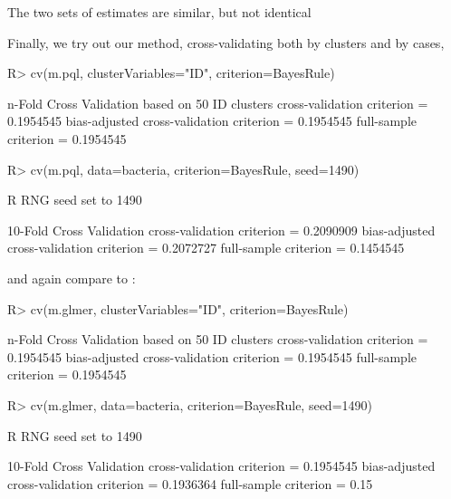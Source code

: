 \documentclass[
]{jss}
\begin{document}
The two sets of estimates are similar, but not identical

Finally, we try out our  method, cross-validating
both by clusters and by cases,

\begin{CodeChunk}
\begin{CodeInput}
R> cv(m.pql, clusterVariables="ID", criterion=BayesRule)
\end{CodeInput}
\begin{CodeOutput}
n-Fold Cross Validation based on 50 {ID} clusters
cross-validation criterion = 0.1954545
bias-adjusted cross-validation criterion = 0.1954545
full-sample criterion = 0.1954545 
\end{CodeOutput}
\begin{CodeInput}
R> cv(m.pql, data=bacteria, criterion=BayesRule, seed=1490)
\end{CodeInput}
\begin{CodeOutput}
R RNG seed set to 1490
\end{CodeOutput}
\begin{CodeOutput}
10-Fold Cross Validation
cross-validation criterion = 0.2090909
bias-adjusted cross-validation criterion = 0.2072727
full-sample criterion = 0.1454545 
\end{CodeOutput}
\end{CodeChunk}

and again compare to :

\begin{CodeChunk}
\begin{CodeInput}
R> cv(m.glmer, clusterVariables="ID", criterion=BayesRule)
\end{CodeInput}
\begin{CodeOutput}
n-Fold Cross Validation based on 50 {ID} clusters
cross-validation criterion = 0.1954545
bias-adjusted cross-validation criterion = 0.1954545
full-sample criterion = 0.1954545 
\end{CodeOutput}
\begin{CodeInput}
R> cv(m.glmer, data=bacteria, criterion=BayesRule, seed=1490)
\end{CodeInput}
\begin{CodeOutput}
R RNG seed set to 1490
\end{CodeOutput}
\begin{CodeOutput}
10-Fold Cross Validation
cross-validation criterion = 0.1954545
bias-adjusted cross-validation criterion = 0.1936364
full-sample criterion = 0.15 
\end{CodeOutput}
\end{CodeChunk}
\end{document}
